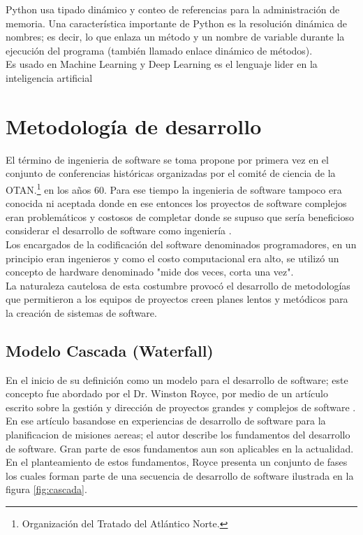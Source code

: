 Python usa tipado dinámico y conteo de referencias para la administración de memoria. Una característica importante de Python es la resolución dinámica de nombres; es decir, lo que enlaza un método y un nombre de variable durante la ejecución del programa (también llamado enlace dinámico de métodos).\\

Es usado en Machine Learning y Deep Learning es el lenguaje lider en la inteligencia artificial

\section{Metodología de desarrollo}
El término de ingenieria de software se toma propone por primera vez en el conjunto de conferencias históricas organizadas por el comité de ciencia de la OTAN.\footnote{Organización del Tratado del Atlántico Norte.} en los años 60. Para ese tiempo la ingenieria de software tampoco era conocida ni aceptada donde en ese entonces los proyectos de software complejos eran problemáticos y costosos de completar donde se supuso que sería beneficioso considerar el desarrollo de software como ingeniería \cite{Ganis}.\\

Los encargados de la codificación del software denominados programadores, en un principio eran ingenieros y como el costo computacional era alto, se utilizó un concepto de hardware denominado "mide dos veces, corta una vez"\cite{Ganis}.\\
La naturaleza cautelosa de esta costumbre provocó el desarrollo de metodologías que permitieron a los equipos de proyectos creen planes lentos y metódicos para la creación de sistemas de software.\\

\subsection{Modelo Cascada (Waterfall)}
En el inicio de su definición como un modelo para el desarrollo de software; este concepto fue abordado por el Dr. Winston Royce, por medio de un artículo escrito sobre la gestión y dirección de proyectos grandes y complejos de software \cite{Winston}. En ese artículo basandose en experiencias de desarrollo de software para la planificacion de misiones aereas; el autor describe los fundamentos del desarrollo de software. Gran parte de esos fundamentos aun son aplicables en la actualidad. En el planteamiento de estos fundamentos, Royce presenta un conjunto de fases los cuales forman parte de una secuencia de desarrollo de software ilustrada en la figura \ref{fig:cascada}.

